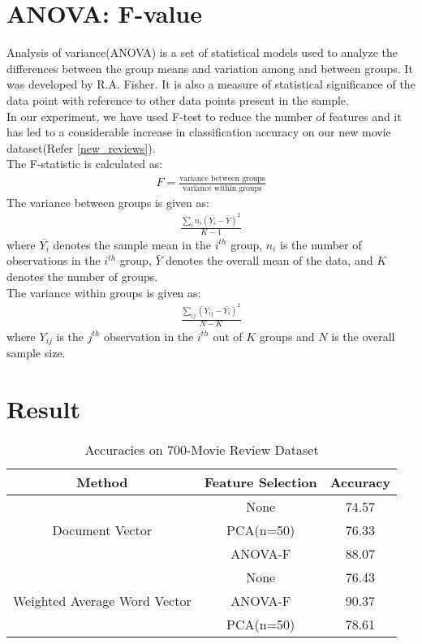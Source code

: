 \section{ANOVA: F-value}
Analysis of variance(ANOVA) is a set of statistical models used to analyze the differences between the group means and variation among and between groups. It was developed by R.A. Fisher. It is also a measure of statistical significance of the data point with reference to other data points present in the sample.\\
In our experiment, we have used F-test to reduce the number of features and it has led to a considerable increase in classification accuracy on our new movie dataset(Refer \ref{new_reviews}).\\
The F-statistic is calculated as:
\begin{align*}
F=\frac{\text{variance between groups}}{\text{variance within groups}}
\end{align*}
The variance between groups is given as:
\begin{align}
\frac{\sum_{i}n_i(\bar{Y_i}-\bar{Y})^2}{K-1}
\end{align}
where $\bar{Y_i}$ denotes the sample mean in the $i^{th}$ group, $n_i$ is the number of observations in the $i^{th}$ group, $\bar{Y}$ denotes the overall mean of the data, and $K$ denotes the number of groups.\\
The variance within groups is given as:
\begin{align}
\frac{\sum_{ij}(Y_{ij}-\bar{Y_i})^2}{N-K}
\end{align}
where $Y_{ij}$ is the $j^{th}$ observation in the $i^{th}$ out of $K$ groups and $N$ is the overall sample size.

\section{Result}
\begin{table}[h!]
\centering
\begin{tabular}{|c|c|c|}
\hline
\textbf{Method} & \textbf{Feature Selection} & \textbf{Accuracy} \\ \hline
\multirow{3}{*}{Document Vector}              & None      & 74.57 \\ \cline{2-3} 
                                              & PCA(n=50) & 76.33 \\ \cline{2-3} 
                                              & ANOVA-F & 88.07 \\ \hline
\multirow{3}{*}{Weighted Average Word Vector} & None      & 76.43 \\ \cline{2-3} 
                                              & ANOVA-F   & 90.37 \\ \cline{2-3} 
                                              & PCA(n=50) & 78.61 \\ \hline
\end{tabular}
\caption {Accuracies on 700-Movie Review Dataset}
\label{table:700_movie_features}
\end{table}

